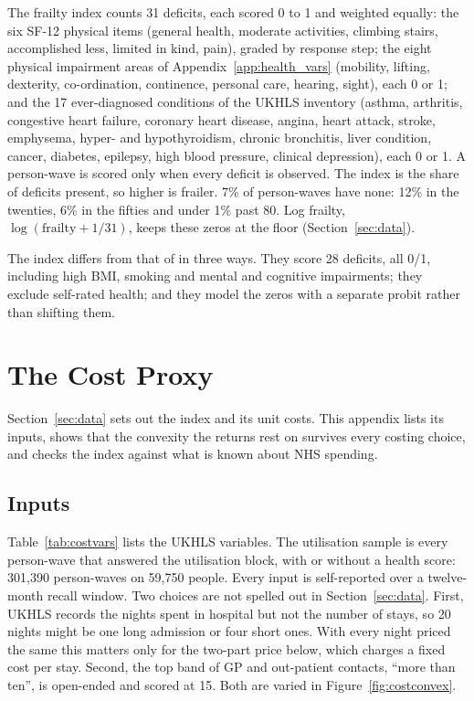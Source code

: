 \documentclass[11pt]{article}
\begin{document}
	The frailty index counts 31 deficits, each scored 0 to 1 and weighted equally: the six SF-12 physical items (general health, moderate activities, climbing stairs, accomplished less, limited in kind, pain), graded by response step; the eight physical impairment areas of Appendix~\ref{app:health_vars} (mobility, lifting, dexterity, co-ordination, continence, personal care, hearing, sight), each 0 or 1; and the 17 ever-diagnosed conditions of the UKHLS inventory (asthma, arthritis, congestive heart failure, coronary heart disease, angina, heart attack, stroke, emphysema, hyper- and hypothyroidism, chronic bronchitis, liver condition, cancer, diabetes, epilepsy, high blood pressure, clinical depression), each 0 or 1. A person-wave is scored only when every deficit is observed. The index is the share of deficits present, so higher is frailer. 7\% of person-waves have none: 12\% in the twenties, 6\% in the fifties and under 1\% past 80. Log frailty, $\log(\text{frailty}+1/31)$, keeps these zeros at the floor (Section~\ref{sec:data}).

	The index differs from that of \citet{hosseini2022} in three ways. They score 28 deficits, all 0/1, including high BMI, smoking and mental and cognitive impairments; they exclude self-rated health; and they model the zeros with a separate probit rather than shifting them.


	\section{The Cost Proxy}
	\label{app:cost}

	Section~\ref{sec:data} sets out the index and its unit costs. This appendix lists its inputs, shows that the convexity the returns rest on survives every costing choice, and checks the index against what is known about NHS spending.

	\subsection{Inputs}

	Table~\ref{tab:costvars} lists the UKHLS variables. The utilisation sample is every person-wave that answered the utilisation block, with or without a health score: 301{,}390 person-waves on 59{,}750 people. Every input is self-reported over a twelve-month recall window. Two choices are not spelled out in Section~\ref{sec:data}. First, UKHLS records the nights spent in hospital but not the number of stays, so 20 nights might be one long admission or four short ones. With every night priced the same this matters only for the two-part price below, which charges a fixed cost per stay. Second, the top band of GP and out-patient contacts, ``more than ten'', is open-ended and scored at 15. Both are varied in Figure~\ref{fig:costconvex}.
\end{document}
